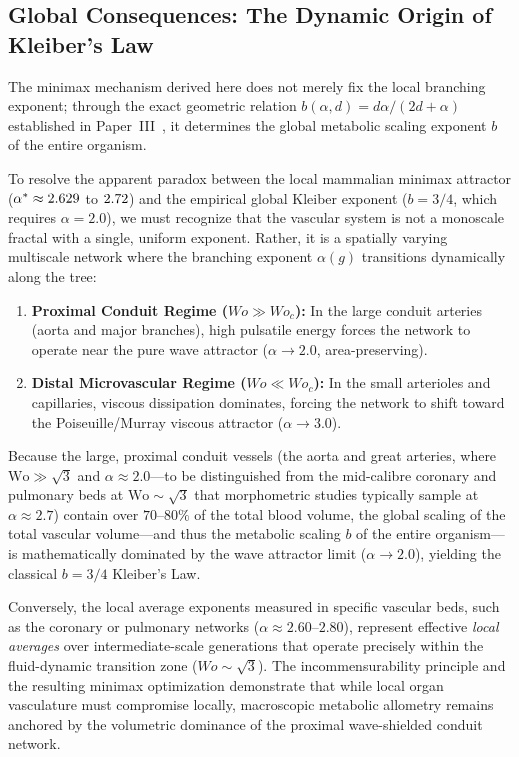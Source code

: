 \subsection{Global Consequences: The Dynamic Origin of Kleiber's Law}

The minimax mechanism derived here does not merely fix the local branching
exponent; through the exact geometric relation $b(\alpha,d) =
d\alpha/(2d+\alpha)$ established in Paper~III~\cite{paperIII}, it determines the
global metabolic scaling exponent $b$ of the entire organism.

To resolve the apparent paradox between the local mammalian minimax attractor
($\alpha^* \approx 2.629$ to $2.72$) and the empirical
global Kleiber exponent ($b = 3/4$, which requires $\alpha = 2.0$), we must
recognize that the vascular system is not a monoscale fractal with a single,
uniform exponent. Rather, it is a spatially varying multiscale network where the
branching exponent $\alpha(g)$ transitions dynamically along the tree:
\begin{enumerate}
    \item
\textbf{Proximal Conduit Regime ($Wo \gg Wo_c$):} In the large conduit arteries
(aorta and major branches), high pulsatile energy forces the network to operate
near the pure wave attractor ($\alpha \to 2.0$, area-preserving).
    \item
\textbf{Distal Microvascular Regime ($Wo \ll Wo_c$):} In the small arterioles
and capillaries, viscous dissipation dominates, forcing the network to shift
toward the Poiseuille/Murray viscous attractor ($\alpha \to 3.0$).
\end{enumerate}

Because the large, proximal conduit vessels (the aorta and great arteries,
where $\mathrm{Wo} \gg \sqrt{3}$ and $\alpha \approx 2.0$---to be distinguished
from the mid-calibre coronary and pulmonary beds at $\mathrm{Wo} \sim \sqrt{3}$
that morphometric studies typically sample at $\alpha \approx 2.7$) contain
over $70\text{--}80\%$ of the total blood volume, the global scaling of the
total vascular volume—and thus the metabolic scaling $b$ of the entire
organism—is mathematically dominated by the wave attractor limit ($\alpha \to
2.0$), yielding the classical $b = 3/4$ Kleiber's Law.

Conversely, the local average exponents measured in specific vascular beds, such
as the coronary or pulmonary networks ($\alpha \approx 2.60\text{--}2.80$),
represent effective \textit{local averages} over intermediate-scale generations
that operate precisely within the fluid-dynamic transition zone ($Wo \sim
\sqrt{3}$). The incommensurability principle and the resulting minimax
optimization demonstrate that while local organ vasculature must compromise
locally, macroscopic metabolic allometry remains anchored by the volumetric
dominance of the proximal wave-shielded conduit network.

